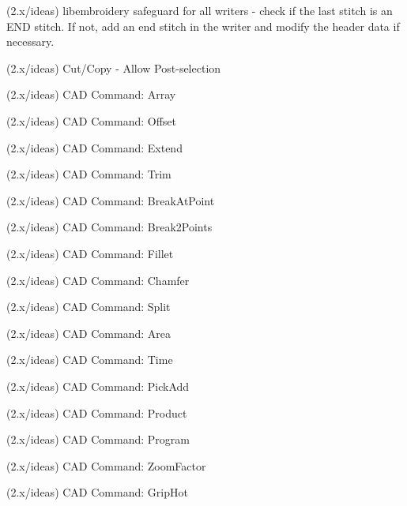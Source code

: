 \begin{DoxyRefList}
\label{todo__todo000071}%
%
(2.\+x/ideas) libembroidery safeguard for all writers -\/ check if the last stitch is an END stitch. If not, add an end stitch in the writer and modify the header data if necessary.

\label{todo__todo000072}%
%
(2.\+x/ideas) Cut/\+Copy -\/ Allow Post-\/selection

\label{todo__todo000073}%
%
(2.\+x/ideas) CAD Command\+: Array

\label{todo__todo000074}%
%
(2.\+x/ideas) CAD Command\+: Offset

\label{todo__todo000075}%
%
(2.\+x/ideas) CAD Command\+: Extend

\label{todo__todo000076}%
%
(2.\+x/ideas) CAD Command\+: Trim

\label{todo__todo000077}%
%
(2.\+x/ideas) CAD Command\+: Break\+At\+Point

\label{todo__todo000078}%
%
(2.\+x/ideas) CAD Command\+: Break2\+Points

\label{todo__todo000079}%
%
(2.\+x/ideas) CAD Command\+: Fillet

\label{todo__todo000080}%
%
(2.\+x/ideas) CAD Command\+: Chamfer

\label{todo__todo000081}%
%
(2.\+x/ideas) CAD Command\+: Split

\label{todo__todo000082}%
%
(2.\+x/ideas) CAD Command\+: Area

\label{todo__todo000083}%
%
(2.\+x/ideas) CAD Command\+: Time

\label{todo__todo000084}%
%
(2.\+x/ideas) CAD Command\+: Pick\+Add

\label{todo__todo000085}%
%
(2.\+x/ideas) CAD Command\+: Product

\label{todo__todo000086}%
%
(2.\+x/ideas) CAD Command\+: Program

\label{todo__todo000087}%
%
(2.\+x/ideas) CAD Command\+: Zoom\+Factor

\label{todo__todo000088}%
%
(2.\+x/ideas) CAD Command\+: Grip\+Hot


\end{DoxyRefList}
